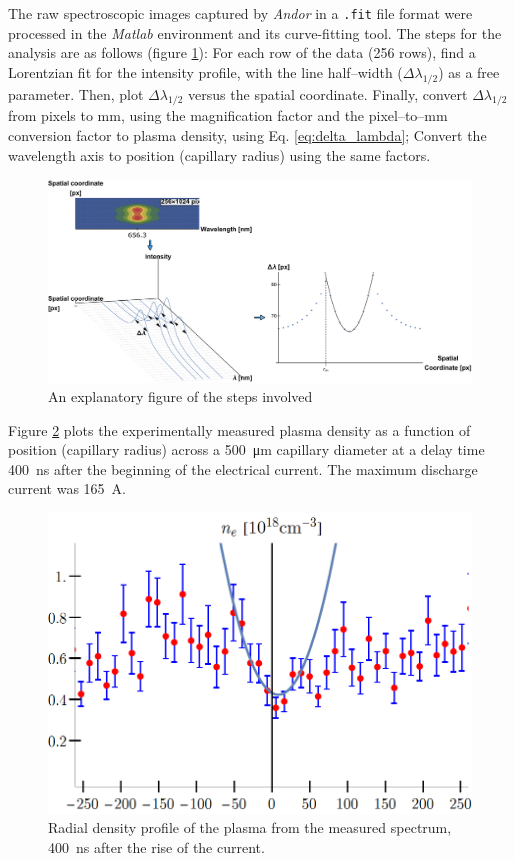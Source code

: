 \documentclass[justified,nofonts,nobib,openany]{tufte-book}
\begin{document}
The raw spectroscopic images captured by \textit{Andor} in a \texttt{.fit} file format were processed in the \textit{Matlab} environment and its curve-fitting tool. The steps for the analysis are as follows (figure \ref{fig:spectra_analysis}): For each row of the data (256 rows), find a Lorentzian fit for the intensity profile, with the line half--width ($\Delta\lambda_{1/2}$) as a free parameter. Then, plot $\Delta\lambda_{1/2}$ versus the spatial coordinate. Finally, convert $\Delta\lambda_{1/2}$ from pixels to \si{\mm}, using the magnification factor and the pixel--to--mm conversion factor to plasma density, using Eq. \ref{eq:delta_lambda}; Convert the wavelength axis to position (capillary radius) using the same factors.
\begin{figure}
    \centering
    \includegraphics[width=\textwidth]{figures/spectro/spectra_analysis.pdf}
    \caption{An explanatory figure of the steps involved}
    \label{fig:spectra_analysis}
\end{figure}

Figure \ref{fig:plasma_channel_spectro} plots the experimentally measured plasma density as a function of position (capillary radius) across a \SI{500}{\um} capillary diameter at a delay time \SI{400}{\ns} after the beginning of the electrical current. The maximum discharge current was \SI{165}{\A}.

\begin{figure}
\centering
\includegraphics[width=\textwidth]{figures/spectro/parabolic.png}
\caption{Radial density profile of the plasma from the measured spectrum, \SI{400}{\ns} after the rise of the current.}
\label{fig:plasma_channel_spectro}
\end{figure}
\end{document}
